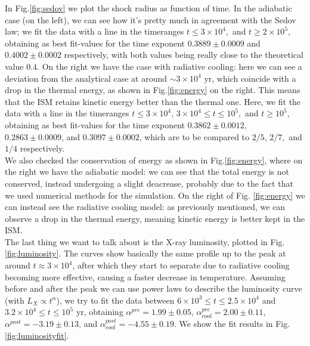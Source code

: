 \documentclass{article}
\begin{document}
In Fig.\ref{fig:sedov} we plot the shock radius as function of time. In the adiabatic case (on the left), we can see how it's pretty much in agreement with the Sedov law; 
we fit the data with a line in the timeranges $t\le3\times 10^{4},$ and $t\ge 2\times 10^5$, obtaining as best fit-values for the time exponent $ 0.3889\pm 0.0009$ and $0.4002\pm 0.0002$ respectively, with both values being really close to the theoretical value $0.4$. On the right we have the case with radiative cooling: here we can see a deviation from the analytical case at around $\sim 3\times 10^4$ yr, which coincide with a drop in the thermal energy, as shown in Fig.\ref{fig:energy} on the right. This means that the ISM retains kinetic energy better than the thermal one. Here, we fit the data with a line in the timeranges $t\le3\times 10^{4},\,3\times10^4\le t\le 10^5,$ and $t\ge 10^5$, obtaining as best fit-values for the time exponent 
$0.3862\pm0.0012$, $0.2863\pm 0.0009$, and $0.3097\pm 0.0002$, which are to be compared to $2/5,\,2/7,$ and $1/4$ respectively.\\
We also checked the conservation of energy as shown in Fig.\ref{fig:energy}, where on the right we have the adiabatic model: we can see that the total energy is not conserved, instead undergoing a slight deacrease, probably due to the fact that we used numerical methods for the simulation. On the right of Fig. \ref{fig:energy} we can instead see the radiative cooling model: as previously mentioned, we can observe a drop in the thermal energy, meaning kinetic energy is better kept in the ISM.\\
The last thing we want to talk about is the X-ray luminosity, plotted in Fig.\ref{fig:luminosity}. The curves show basically the same profile up to the peak at around $t\approx 3\times 10^4$, after which they start to separate due to radiative cooling becoming more effective, causing a faster decrease in temperature. Assuming before and after the peak we can use power laws to describe the luminosity curve (with $L_X\propto t^{\alpha}$), we try to fit the data between $6\times 10^3\le t\le 2.5\times 10^4$ and $3.2\times 10^4\le t\le 10^5$ yr, obtaining $\alpha^{pre}=1.99\pm0.05$, $\alpha^{pre}_{cool}=2.00\pm0.11$, $\alpha^{post}=-3.19\pm0.13$, and $\alpha^{post}_{cool}=-4.55\pm0.19$. We show the fit results in Fig.\ref{fig:luminosityfit}.
\end{document}
